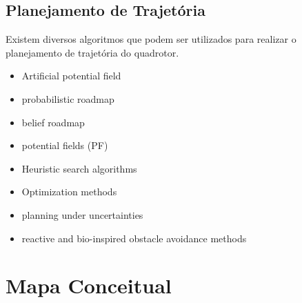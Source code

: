 \subsection{Planejamento de Trajetória}
Existem diversos algoritmos que podem ser utilizados para realizar o planejamento de trajetória do quadrotor.
\begin{itemize}
    \item Artificial potential field
    \item probabilistic roadmap
    \item belief roadmap
    \item potential fields (PF)
    \item Heuristic search algorithms
    \item Optimization methods
    \item planning under uncertainties
    \item reactive and bio-inspired obstacle avoidance methods
\end{itemize}


\section{Mapa Conceitual}
